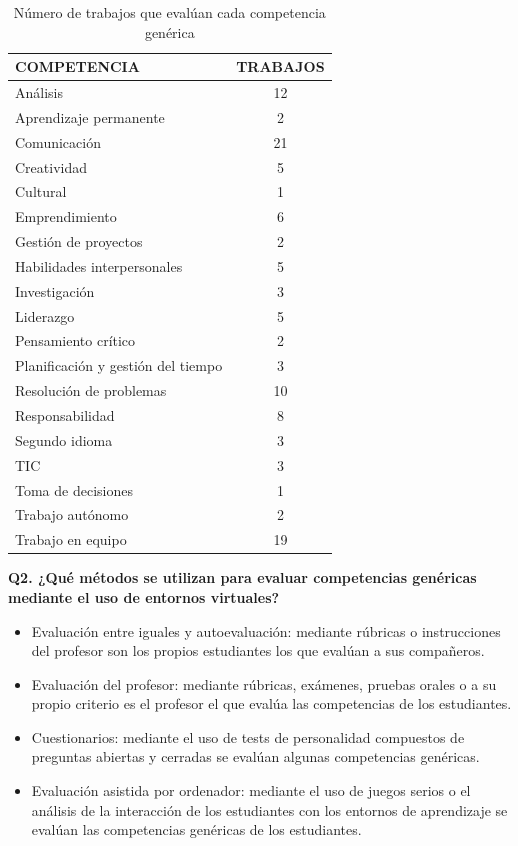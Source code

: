 
\begin{table}
  \begin{center}
  \begin{tabular}{| m{10cm} | c |}
    \hline
    COMPETENCIA & TRABAJOS\\
    \hline
    \hline
    Análisis & 12\\
    \hline
    Aprendizaje permanente & 2\\
    \hline
    Comunicación & 21\\
    \hline
    Creatividad & 5\\
    \hline
    Cultural & 1\\
    \hline
    Emprendimiento & 6\\
    \hline
    Gestión de proyectos & 2\\
    \hline
    Habilidades interpersonales & 5\\
    \hline
    Investigación & 3\\
    \hline
    Liderazgo & 5\\
    \hline
    Pensamiento crítico & 2\\
    \hline
    Planificación y gestión del tiempo & 3\\
    \hline
    Resolución de problemas & 10\\
    \hline
    Responsabilidad & 8\\
    \hline 
    Segundo idioma & 3\\
    \hline
    TIC & 3\\
    \hline
    Toma de decisiones & 1\\
    \hline
    Trabajo autónomo & 2\\
    \hline
    Trabajo en equipo & 19\\
    \hline
  \end{tabular}
\end{center}
\caption{Número de trabajos que evalúan cada competencia genérica}
\label{tab:TrabajosCompetencia}
\end{table} 

\bigskip
\textbf{Q2. ¿Qué métodos se utilizan para evaluar competencias genéricas mediante el uso de entornos virtuales?}

\begin{itemize}
\item Evaluación entre iguales y autoevaluación: mediante rúbricas o instrucciones del profesor son los propios estudiantes los que evalúan a sus compañeros.
\item Evaluación del profesor: mediante rúbricas, exámenes, pruebas orales o a su propio criterio es el profesor el que evalúa las competencias de los estudiantes.
\item Cuestionarios: mediante el uso de tests de personalidad compuestos de preguntas abiertas y cerradas se evalúan algunas competencias genéricas.
\item Evaluación asistida por ordenador: mediante el uso de juegos serios o el análisis de la interacción de los estudiantes con los entornos de aprendizaje se evalúan las competencias genéricas de los estudiantes.
\end{itemize}


